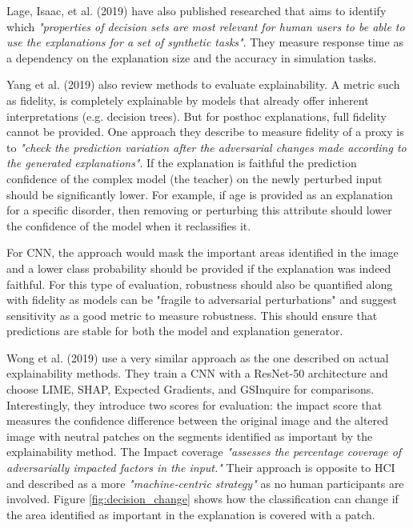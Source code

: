\documentclass[proposal]{softeng}
\begin{document}
Lage, Isaac, et al. (2019) \cite{LageIsaac2019AEot} have also published researched  that aims to identify which \textit{"properties of decision sets are most relevant for human users to be able to use the explanations for a set of synthetic tasks"}. They  measure response time as a dependency on the explanation size and the accuracy in simulation tasks.

Yang et al. (2019) \cite{YangFan2019EEWG} also review methods to evaluate explainability. A metric such as fidelity, is completely explainable by models that already offer inherent interpretations (e.g. decision trees). But for posthoc explanations, full fidelity cannot be provided. One approach they describe to measure fidelity of a proxy is to \textit{"check the prediction variation after the adversarial changes made according to the generated explanations"}. If the explanation is faithful the prediction confidence of the complex model (the teacher) on the newly perturbed input should be significantly lower. For example, if age is provided as an explanation for a specific disorder, then removing or perturbing this attribute should lower the confidence of the model when it reclassifies it. 

For CNN, the approach would mask the important areas identified in the image and a lower class probability should be provided if the explanation was indeed faithful. For this type of evaluation, robustness should also be quantified along with fidelity as models can be "fragile to adversarial perturbations" and suggest sensitivity as a good metric to measure robustness. This should ensure that predictions are stable for both the model and explanation generator.

Wong et al. (2019) \cite{LinZhongQiu2019DERD} use a very similar approach as the one described on actual explainability methods. They train a CNN with a ResNet-50 architecture and choose LIME, SHAP, Expected Gradients, and GSInquire for comparisons. Interestingly, they introduce two scores for evaluation: the impact score that measures the confidence difference between the original image and the altered image with neutral patches on the segments identified as important by the explainability method. The Impact coverage \textit{"assesses the percentage coverage of adversarially impacted factors in the input."} Their approach is opposite to HCI and described as a more \textit{"machine-centric strategy"} as no human participants are involved. Figure \ref{fig:decision_change} shows how the classification can change if the area identified as important in the explanation is covered with a patch.
\end{document}
